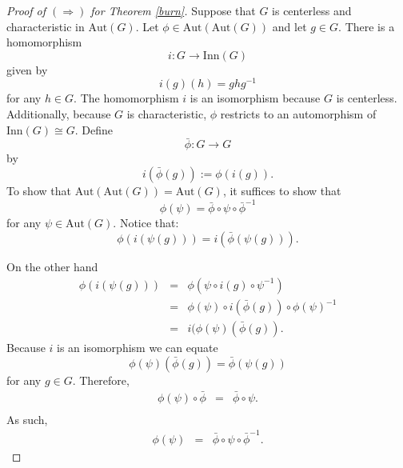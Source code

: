 \documentclass[a4paper]{amsproc}
\theoremstyle{TheoremNum}
\theoremstyle{Theorembold}
\theoremstyle{TheoremboldDef}
\theoremstyle{TheoremboldRem}
\theoremstyle{TheoremboldRem}
\begin{document}
\begin{proof}[Proof of $(\Rightarrow)$ for Theorem \ref{burn}] Suppose that $G$ is centerless and characteristic in $\text{Aut}(G)$. Let $\phi\in \text{Aut}(\text{Aut}(G))$ and let $g\in G$. There is a homomorphism \[i:G\rightarrow \text{Inn}(G)\] given by \[i(g)(h)=ghg^{-1}\] for any $h\in G$. The homomorphism $i$ is an isomorphism because $G$ is centerless. Additionally, because $G$ is characteristic, $\phi$ restricts to an automorphism of $\text{Inn}(G)\cong G$. Define \[\bar{\phi}:G\to G\] by \[i(\bar{\phi}(g)):=\phi(i(g)).\] To show that $\text{Aut}(\text{Aut}(G))=\text{Aut}(G)$, it suffices to show that \[\phi(\psi)=\bar{\phi}\circ\psi\circ \bar{\phi}^{-1}
\] for any $\psi\in\text{Aut}(G)$. Notice that: \[
\phi(i(\psi(g)))=i(\bar{\phi}(\psi(g))).\]

On the other hand \begin{eqnarray*}
\phi(i(\psi(g)))&=& \phi(\psi\circ i(g)\circ \psi^{-1})\\ &=& \phi(\psi)\circ i(\bar{\phi}(g))\circ \phi(\psi)^{-1}\\&=& i(\phi(\psi)(\bar{\phi}(g)).
\end{eqnarray*}  Because $i$ is an isomorphism we can equate \[\phi(\psi)(\bar{\phi}(g))=\bar{\phi}(\psi(g))\] for any $g\in G$. Therefore, \begin{eqnarray*}\phi(\psi)\circ\bar{\phi}&=&\bar{\phi}\circ\psi.\\  \end{eqnarray*} As such, \begin{eqnarray*}
 \phi(\psi)&=&\bar{\phi}\circ\psi\circ\bar{\phi}^{-1}.\end{eqnarray*}
\end{proof}
\end{document}
